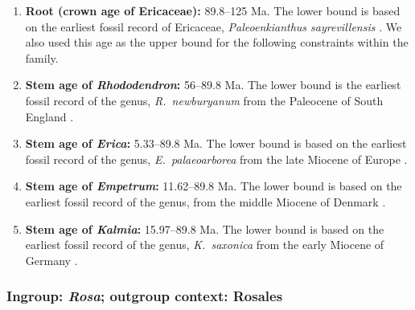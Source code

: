 \begin{enumerate}

\item \textbf{Root (crown age of Ericaceae):} 89.8--125 Ma. The lower
  bound is based on the earliest fossil record of Ericaceae,
  \textit{Paleoenkianthus sayrevillensis} \citep{Nixon1993}. We also
  used this age as the upper bound for the following constraints
  within the family.

\item \textbf{Stem age of \textit{Rhododendron}:} 56--89.8 Ma. The
  lower bound is the earliest fossil record of the genus,
  \textit{R.~newburyanum} from the Paleocene of South England
  \citep{Collinson1978}.

\item \textbf{Stem age of \textit{Erica}:} 5.33--89.8 Ma. The lower
  bound is based on the earliest fossil record of the genus,
  \textit{E.~palaeoarborea} from the late Miocene of Europe
  \citep{VanderBurgh1987}.

\item \textbf{Stem age of \textit{Empetrum}:} 11.62--89.8 Ma. The
  lower bound is based on the earliest fossil record of the genus,
  from the middle Miocene of Denmark \citep{Friis1979}.

\item \textbf{Stem age of \textit{Kalmia}:} 15.97--89.8 Ma. The lower
  bound is based on the earliest fossil record of the genus,
  \textit{K.~saxonica} from the early Miocene of Germany
  \citep{VanderBurgh1987}.

\end{enumerate}

\subsubsection*{Ingroup: \textit{Rosa}; outgroup context: Rosales}


